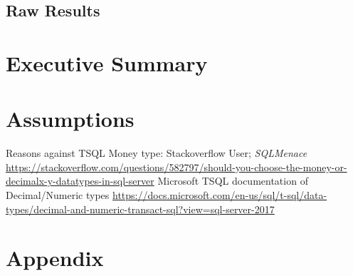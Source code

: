 \documentclass{article}
\newcounter{num}
\begin{document}
        \subsection{Raw Results}

    \newpage
    \section{Executive Summary}

    \newpage
    \section{Assumptions}

    \newpage
    \begin{thebibliography}{9}
        \raggedright
            Reasons against TSQL Money type: Stackoverflow User; \textit{SQLMenace}
            \url{https://stackoverflow.com/questions/582797/should-you-choose-the-money-or-decimalx-y-datatypes-in-sql-server}
            Microsoft TSQL documentation of Decimal/Numeric types
            \url{https://docs.microsoft.com/en-us/sql/t-sql/data-types/decimal-and-numeric-transact-sql?view=sql-server-2017}
    \end{thebibliography}

    \newpage
    \section{Appendix}
    \label{sec:Appendix}

    
\end{document}
